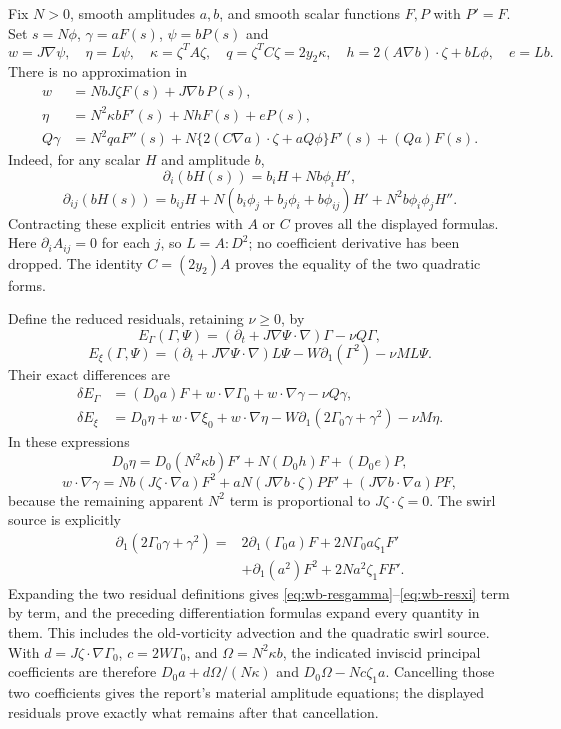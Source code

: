 Fix $N>0$, smooth amplitudes $a,b$, and smooth scalar functions $F,P$
with $P'=F$. Set $s=N\phi$, $\gamma=aF(s)$, $\psi=bP(s)$ and
\[
 w=J\nabla\psi,\quad \eta=L\psi,\quad
 \kappa=\zeta^TA\zeta,\quad q=\zeta^TC\zeta=2y_2\kappa,
 \quad h=2(A\nabla b)\cdot\zeta+bL\phi,\quad e=Lb.
\]
There is no approximation in
\begin{align}
 w&=NbJ\zeta F(s)+J\nabla b\,P(s),\label{eq:wb-w}\\
 \eta&=N^2\kappa b F'(s)+NhF(s)+eP(s),\label{eq:wb-eta}\\
 Q\gamma&=N^2qaF''(s)
       +N\{2(C\nabla a)\cdot\zeta+aQ\phi\}F'(s)+(Qa)F(s).
 \label{eq:wb-Qgamma}
\end{align}
Indeed, for any scalar $H$ and amplitude $b$,
\[
 \partial_i(bH(s))=b_iH+Nb\phi_iH',
\]
\[
 \partial_{ij}(bH(s))=b_{ij}H
 +N(b_i\phi_j+b_j\phi_i+b\phi_{ij})H'
 +N^2b\phi_i\phi_jH''.
\]
Contracting these explicit entries with $A$ or $C$ proves all the
displayed formulas. Here $\partial_iA_{ij}=0$ for each $j$, so
$L=A:D^2$; no coefficient derivative has been dropped. The identity
$C=(2y_2)A$ proves the equality of the two quadratic forms.

Define the reduced residuals, retaining $\nu\geq0$, by
\[
 E_\Gamma(\Gamma,\Psi)=
 (\partial_t+J\nabla\Psi\cdot\nabla)\Gamma-\nu Q\Gamma,
\]
\[
 E_\xi(\Gamma,\Psi)=
 (\partial_t+J\nabla\Psi\cdot\nabla)L\Psi
 -W\partial_1(\Gamma^2)-\nu ML\Psi.
\]
Their exact differences are
\begin{align}
 \delta E_\Gamma&=(D_0a)F+w\cdot\nabla\Gamma_0
                         +w\cdot\nabla\gamma-\nu Q\gamma,
                         \label{eq:wb-resgamma}\\
 \delta E_\xi&=D_0\eta+w\cdot\nabla\xi_0+w\cdot\nabla\eta
 -W\partial_1(2\Gamma_0\gamma+\gamma^2)-\nu M\eta.
 \label{eq:wb-resxi}
\end{align}
In these expressions
\[
 D_0\eta=D_0(N^2\kappa b)F'+N(D_0h)F+(D_0e)P,
\]
\[
 w\cdot\nabla\gamma=
 Nb(J\zeta\cdot\nabla a)F^2
 +aN(J\nabla b\cdot\zeta)PF'
 +(J\nabla b\cdot\nabla a)PF,
\]
because the remaining apparent $N^2$ term is proportional to
$J\zeta\cdot\zeta=0$. The swirl source is explicitly
\begin{align*}
 \partial_1(2\Gamma_0\gamma+\gamma^2)
 ={}&2\partial_1(\Gamma_0a)F+2N\Gamma_0a\zeta_1F'\\
 &+\partial_1(a^2)F^2+2Na^2\zeta_1FF'.
\end{align*}
Expanding the two residual definitions gives
\eqref{eq:wb-resgamma}--\eqref{eq:wb-resxi} term by term, and the
preceding differentiation formulas expand every quantity in them.
This includes the old-vorticity advection and the quadratic swirl source.
With $d=J\zeta\cdot\nabla\Gamma_0$, $c=2W\Gamma_0$,
and $\Omega=N^2\kappa b$, the indicated inviscid principal coefficients
are therefore $D_0a+d\Omega/(N\kappa)$ and
$D_0\Omega-Nc\zeta_1a$. Cancelling those two coefficients gives
the report's material amplitude equations; the displayed residuals prove
exactly what remains after that cancellation.

